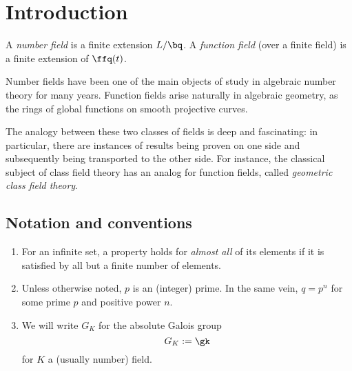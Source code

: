 \chapter*{Introduction}

A \textit{number field} is a finite extension $L/\bq$. A \textit{function field}
(over a finite field) is a finite extension of $\ffq(t)$.

Number fields have been one of the main objects of study in algebraic number
theory for many years. Function fields arise naturally in algebraic geometry, as
the rings of global functions on smooth projective curves.

The analogy between these two classes of fields is deep and fascinating: in
particular, there are instances of results being proven on one side and
subsequently being transported to the other side. For instance, the classical
subject of class field theory has an analog for function fields, called
\textit{geometric class field theory}.

\section*{Notation and conventions}
\begin{enumerate}
\item For an infinite set, a property holds for \textit{almost all} of its
  elements if it is satisfied by all but a finite number of elements.
\item Unless otherwise noted, $p$ is an (integer) prime. In the same vein, $q=
  p^n$ for some prime $p$ and positive power $n$.
\item We will write $G_K$ for the absolute Galois group
  \[ G_K := \gk \]
  for $K$ a (usually number) field.
\end{enumerate}
